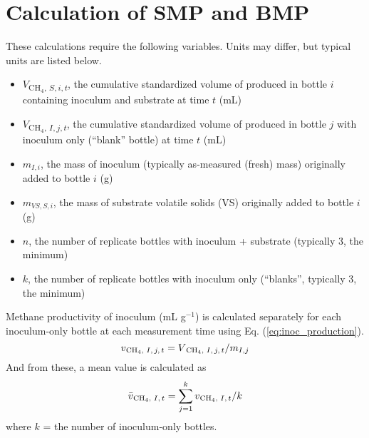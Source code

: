 \documentclass[]{article}
\begin{document}
\section{Calculation of SMP and BMP}
These calculations require the following variables.
Units may differ, but typical units are listed below.
\begin{itemize}
  \item $V$\textsubscript{{CH$_4$, $S, i, t$}}, the cumulative standardized volume of  produced in bottle $i$ containing inoculum and substrate at time $t$ (mL)
  \item $V$\textsubscript{{CH$_4$, $I, j, t$}}, the cumulative standardized volume of  produced in bottle $j$ with inoculum only (``blank'' bottle) at time $t$ (mL)
  \item $m_{I, i}$, the mass of inoculum (typically as-measured (fresh) mass) originally added to bottle $i$ (g)
  \item $m_{VS, S, i}$, the mass of substrate volatile solids (VS) originally added to bottle $i$ (g)
  \item $n$, the number of replicate bottles with inoculum + substrate (typically 3, the minimum)
  \item $k$, the number of replicate bottles with inoculum only (``blanks'', typically 3, the minimum)
\end{itemize}

Methane productivity of inoculum (mL g$^{-1}$) is calculated separately for each inoculum-only bottle at each measurement time using Eq. (\ref{eq:inoc_production}).
\begin{equation}
  \label{eq:inoc_production}
  v\textsubscript{{CH$_4$, $I, j, t$}} = V\textsubscript{{CH$_4$, $I, j, t$}} / m_{I, j} 
\end{equation}
And from these, a mean value is calculated as 
\begin{equation}
  \label{eq:inoc_productivity}
  \bar{v}\textsubscript{{CH$_4$, $I, t$}} = \sum_{j = 1} ^k v\textsubscript{{CH$_4$, $I, t$}} / k
\end{equation}
where $k$ = the number of inoculum-only bottles.
\end{document}

